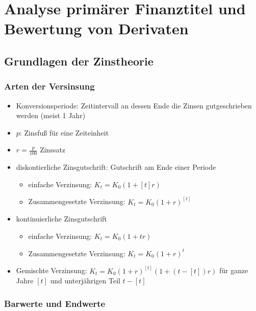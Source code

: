 \documentclass[12pt]{report}
\theoremstyle{dotless}
\theoremstyle{definition}
\begin{document}


\chapter{Analyse prim\"arer Finanztitel und Bewertung von Derivaten}

\section{Grundlagen der Zinstheorie}

\subsection{Arten der Versinsung}

\begin{itemize}
	\item Konversionsperiode: Zeitintervall an dessen Ende die Zinsen gutgeschrieben werden (meist 1 Jahr)
	\item $p$: Zinsfu{\ss} f\"ur eine Zeiteinheit
	\item $r=\frac{p}{100}$ Zinssatz
	\item diskontierliche Zinsgutschrift: Gutschrift am Ende einer Periode
		\begin{itemize}
			\item einfache Verzinsung: $K_t = K_0(1+[t]r)$
			\item Zusammengesetzte Verzinsung: $K_t=K_0(1+r)^{[t]}$
		\end{itemize}
	\item kontinuierliche Zinsgutschrift
		\begin{itemize}
			\item einfache Verzinsung: $K_t = K_0(1+tr)$
			\item Zusammengesetzte Verzinsung: $K_t=K_0(1+r)^{t}$
		\end{itemize}
	\item Gemischte Verzinsung: $K_t=K_0(1+r)^{[t]}(1+(t-[t])r)$ f\"ur ganze Jahre $[t]$ und unterj\"ahrigen Teil $t-[t]$
\end{itemize}

\subsection{Barwerte und Endwerte}
\end{document}
